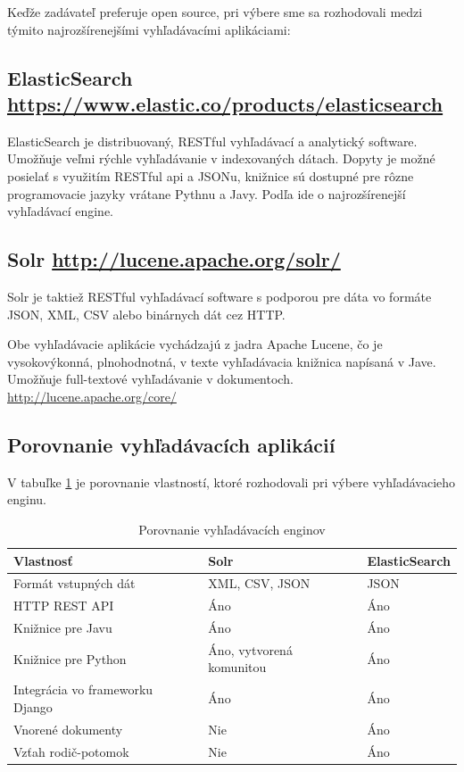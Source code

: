 \documentclass[thesis=M,slovak]{FITthesis}[2013/05/06]
\begin{document}
Keďže zadávateľ preferuje open source, pri výbere sme sa rozhodovali medzi týmito najrozšírenejšími vyhľadávacími aplikáciami:
\subsection{ElasticSearch \url{https://www.elastic.co/products/elasticsearch}}

ElasticSearch je distribuovaný, RESTful vyhľadávací a analytický software. Umožňuje veľmi rýchle vyhľadávanie v indexovaných dátach. Dopyty je možné posielať s využitím RESTful api a JSONu, knižnice sú dostupné pre rôzne programovacie jazyky vrátane Pythnu a Javy. Podľa \cite{NajpouzivanejsieVyhladavace} ide o najrozšírenejší vyhľadávací engine.

\subsection{Solr \url{http://lucene.apache.org/solr/}}

Solr je taktiež RESTful vyhľadávací software s podporou pre dáta vo formáte JSON, XML, CSV alebo binárnych dát cez HTTP.

Obe vyhľadávacie aplikácie vychádzajú z jadra Apache Lucene, čo je vysokovýkonná, plnohodnotná, v texte vyhľadávacia knižnica napísaná v Jave. Umožňuje full-textové vyhľadávanie v dokumentoch. \url{http://lucene.apache.org/core/}

\subsection{Porovnanie vyhľadávacích aplikácií}
V tabuľke \ref{tab:searchEngines} je porovnanie vlastností, ktoré rozhodovali pri výbere vyhľadávacieho enginu.

\begin{table}[!htbp]\centering
 	\caption[ElasticSearch vs. Solr]{Porovnanie vyhľadávacích enginov}\label{tab:searchEngines}
\begin{tabularx}{\textwidth}{|l|X|X|} \hline
Vlastnosť & Solr                         & ElasticSearch \\ \hline
Formát vstupných dát   & XML, CSV, JSON	 & JSON \\ \hline
HTTP REST API & Áno & Áno \\ \hline
Knižnice pre Javu & Áno & Áno \\ \hline
Knižnice pre Python & Áno, vytvorená komunitou & Áno \\ \hline
Integrácia vo frameworku Django & Áno & Áno \\ \hline
Vnorené dokumenty & Nie & Áno \\ \hline
Vzťah rodič-potomok & Nie & Áno \\ \hline
\end{tabularx}
\end{table}
\end{document}
